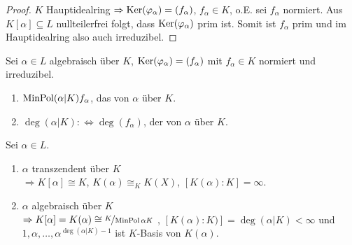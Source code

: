 \begin{proof}
	$K$ Hauptidealring $\Rightarrow \operatorname{Ker}(\varphi_\alpha) = (f_\alpha)$, $f_\alpha \in K$, o.E. sei $f_{\alpha}$ normiert. Aus $K[\alpha] \subseteq L$ nullteilerfrei folgt, dass $\operatorname{Ker}(\varphi_\alpha)$ prim ist. Somit ist $f_\alpha$ prim und im Hauptidealring also auch irreduzibel.
\end{proof}

\begin{definition}
	Sei $\alpha \in L$ algebraisch über $K$, $\operatorname{Ker}(\varphi_\alpha) = (f_\alpha)$ mit $f_\alpha \in K$ normiert und irreduzibel.
	\begin{enumerate}
		\item $\operatorname{MinPol}(\alpha\vert K)  f_\alpha$, das  von $\alpha$ über $K$.
		\item $\deg(\alpha\vert K) :\Leftrightarrow \deg(f_\alpha)$, der  von $\alpha$ über $K$.
	\end{enumerate}
\end{definition}

\begin{proposition}
	Sei $\alpha \in L$.
	\begin{enumerate}
		\item $\alpha$ transzendent über $K$ \\
		$\Rightarrow K[\alpha] \cong K$, $K(\alpha) \cong_K K(X)$, $[K(\alpha) \colon K] = \infty$.
		\item $\alpha$ algebraisch über $K$ \\
		$\Rightarrow K[\alpha] = K(\alpha) \cong \lnkset{K}{\MinPol{\alpha}{K}}$ , $[ K(\alpha) \colon K)]  = \deg(\alpha \vert K) < \infty$ und \\
		$1, \alpha, \dots , \alpha^{\deg(\alpha \vert K) -1}$ ist $K$-Basis von $K(\alpha)$. 
	\end{enumerate}
\end{proposition}

